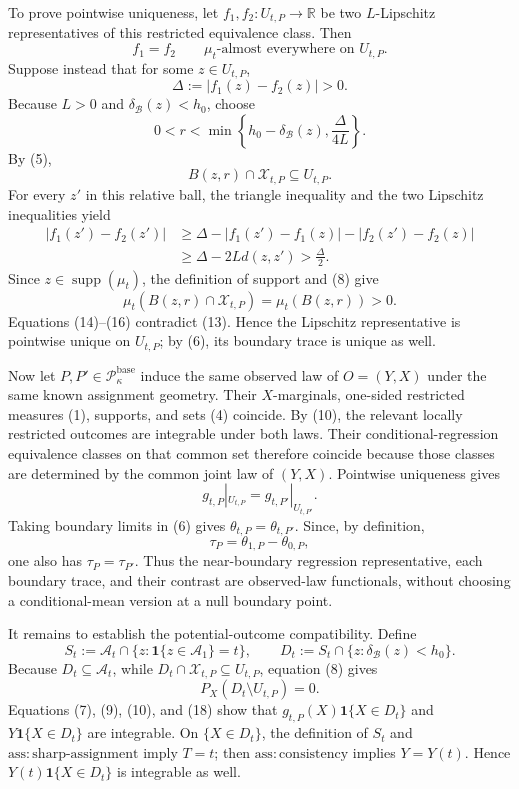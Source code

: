To prove pointwise uniqueness, let \(f_1,f_2:U_{t,P}\to\mathbb R\) be two \(L\)-Lipschitz representatives of this restricted equivalence class. Then
\[
 f_1=f_2\qquad \mu_t\text{-almost everywhere on }U_{t,P}.
 \tag{13}
\]
Suppose instead that for some \(z\in U_{t,P}\),
\[
 \Delta:=|f_1(z)-f_2(z)|>0.
\]
Because \(L>0\) and \(\delta_{\mathcal B}(z)<h_0\), choose
\[
 0<r<\min\left\{h_0-\delta_{\mathcal B}(z),\frac{\Delta}{4L}\right\}.
\]
By (5),
\[
 B(z,r)\cap\mathcal X_{t,P}\subseteq U_{t,P}.
 \tag{14}
\]
For every \(z'\) in this relative ball, the triangle inequality and the two Lipschitz inequalities yield
\[
 \begin{aligned}
 |f_1(z')-f_2(z')|
 &\ge \Delta-|f_1(z')-f_1(z)|-|f_2(z')-f_2(z)|\\
 &\ge \Delta-2Ld(z,z')>\frac{\Delta}{2}.
 \end{aligned}
 \tag{15}
\]
Since \(z\in\operatorname{supp}(\mu_t)\), the definition of support and (8) give
\[
 \mu_t(B(z,r)\cap\mathcal X_{t,P})
 =\mu_t(B(z,r))>0.
 \tag{16}
\]
Equations (14)--(16) contradict (13). Hence the Lipschitz representative is pointwise unique on \(U_{t,P}\); by (6), its boundary trace is unique as well.

Now let \(P,P'\in\mathcal P_{\kappa}^{\mathrm{base}}\) induce the same observed law of \(O=(Y,X)\) under the same known assignment geometry. Their \(X\)-marginals, one-sided restricted measures (1), supports, and sets (4) coincide. By (10), the relevant locally restricted outcomes are integrable under both laws. Their conditional-regression equivalence classes on that common set therefore coincide because those classes are determined by the common joint law of \((Y,X)\). Pointwise uniqueness gives
\[
 g_{t,P}|_{U_{t,P}}=g_{t,P'}|_{U_{t,P'}}.
\]
Taking boundary limits in (6) gives \(\theta_{t,P}=\theta_{t,P'}\). Since, by definition,
\[
 \tau_P=\theta_{1,P}-\theta_{0,P},
\]
one also has \(\tau_P=\tau_{P'}\). Thus the near-boundary regression representative, each boundary trace, and their contrast are observed-law functionals, without choosing a conditional-mean version at a null boundary point.

It remains to establish the potential-outcome compatibility. Define
\[
 S_t:=\mathcal A_t\cap\{z:\mathbf 1\{z\in\mathcal A_1\}=t\},
 \qquad
 D_t:=S_t\cap\{z:\delta_{\mathcal B}(z)<h_0\}.
 \tag{17}
\]
Because \(D_t\subseteq\mathcal A_t\), while \(D_t\cap\mathcal X_{t,P}\subseteq U_{t,P}\), equation (8) gives
\[
 P_X(D_t\setminus U_{t,P})=0.
 \tag{18}
\]
Equations (7), (9), (10), and (18) show that \(g_{t,P}(X)\mathbf 1\{X\in D_t\}\) and \(Y\mathbf 1\{X\in D_t\}\) are integrable. On \(\{X\in D_t\}\), the definition of \(S_t\) and \(\mathrm{ass:sharp\text{-}assignment}\) imply \(T=t\); then \(\mathrm{ass:consistency}\) implies \(Y=Y(t)\). Hence \(Y(t)\mathbf 1\{X\in D_t\}\) is integrable as well.

